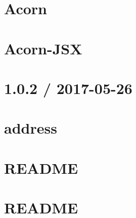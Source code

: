 \documentclass[twoside]{book}
\newcommand{\+}{\discretionary{\mbox{\scriptsize$\hookleftarrow$}}{}{}}
\begin{document}
\chapter{Acorn}
\label{md__c_1_workspace_demo_src_main_script_node_modules_acorn-jsx_node_modules_acorn__r_e_a_d_m_e}

\chapter{Acorn-\/\+J\+SX}
\label{md__c_1_workspace_demo_src_main_script_node_modules_acorn-jsx__r_e_a_d_m_e}

\chapter{1.0.2 / 2017-\/05-\/26}
\label{md__c_1_workspace_demo_src_main_script_node_modules_address__history}

\chapter{address}
\label{md__c_1_workspace_demo_src_main_script_node_modules_address__r_e_a_d_m_e}

\chapter{R\+E\+A\+D\+ME}
\label{md__c_1_workspace_demo_src_main_script_node_modules_ajv_lib_dotjs__r_e_a_d_m_e}

\chapter{R\+E\+A\+D\+ME}
\label{md__c_1_workspace_demo_src_main_script_node_modules_ajv__r_e_a_d_m_e}

\end{document}
